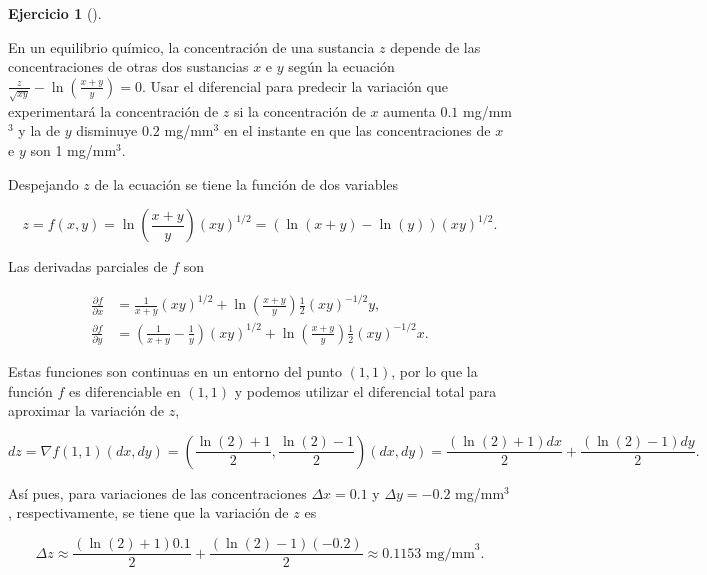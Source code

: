 \documentclass[
  spanish,
  a4paper,
]{scrreport}
\theoremstyle{definition}
\newtheorem{exercise}{Ejercicio}[chapter]
\theoremstyle{remark}
\begin{document}
\begin{exercise}[]\protect\hypertarget{exr-aproximacion-variabicon-concentraciones-equilibrio-quimico}{}\label{exr-aproximacion-variabicon-concentraciones-equilibrio-quimico}

En un equilibrio químico, la concentración de una sustancia \(z\)
depende de las concentraciones de otras dos sustancias \(x\) e \(y\)
según la ecuación
\(\frac{z}{\sqrt{xy}}-\ln\left(\frac{x+y}{y}\right) = 0\). Usar el
diferencial para predecir la variación que experimentará la
concentración de \(z\) si la concentración de \(x\) aumenta \(0.1\)
mg/mm\(^3\) y la de \(y\) disminuye \(0.2\) mg/mm\(^3\) en el instante
en que las concentraciones de \(x\) e \(y\) son 1 mg/mm\(^3\).

\end{exercise}

\begin{tcolorbox}[enhanced jigsaw, arc=.35mm, bottomrule=.15mm, bottomtitle=1mm, breakable, colback=white, colbacktitle=quarto-callout-tip-color!10!white, colframe=quarto-callout-tip-color-frame, coltitle=black, left=2mm, leftrule=.75mm, opacityback=0, opacitybacktitle=0.6, rightrule=.15mm, title=\textcolor{quarto-callout-tip-color}{\faLightbulb}\hspace{0.5em}{Solución}, titlerule=0mm, toprule=.15mm, toptitle=1mm]

Despejando \(z\) de la ecuación se tiene la función de dos variables

\[
z = f(x,y) = \ln\left(\frac{x+y}{y}\right)(xy)^{1/2} 
= (\ln(x+y)-\ln(y))(xy)^{1/2}.
\]

Las derivadas parciales de \(f\) son

\begin{align*}
\frac{\partial f}{\partial x} 
&= \frac{1}{x+y}(xy)^{1/2} + \ln\left(\frac{x+y}{y}\right)\frac{1}{2}(xy)^{-1/2}y, \\
\frac{\partial f}{\partial y} 
&= \left(\frac{1}{x+y}-\frac{1}{y}\right)(xy)^{1/2} + \ln\left(\frac{x+y}{y}\right)\frac{1}{2}(xy)^{-1/2}x.
\end{align*}

Estas funciones son continuas en un entorno del punto \((1,1)\), por lo
que la función \(f\) es diferenciable en \((1,1)\) y podemos utilizar el
diferencial total para aproximar la variación de \(z\),

\[
dz 
= \nabla f(1,1)(dx,dy)
= \left(\frac{\ln(2)+1}{2}, \frac{\ln(2)-1}{2}\right)(dx, dy)
= \frac{(\ln(2)+1)dx}{2}+\frac{(\ln(2)-1)dy}{2}.
\]

Así pues, para variaciones de las concentraciones \(\Delta x=0.1\) y
\(\Delta y = -0.2\) mg/mm\(^3\), respectivamente, se tiene que la
variación de \(z\) es

\[
\Delta z \approx \frac{(\ln(2)+1)0.1}{2}+\frac{(\ln(2)-1)(-0.2)}{2} 
\approx 0.1153 \mbox{ mg/mm}^3.
\]

\end{tcolorbox}
\end{document}
